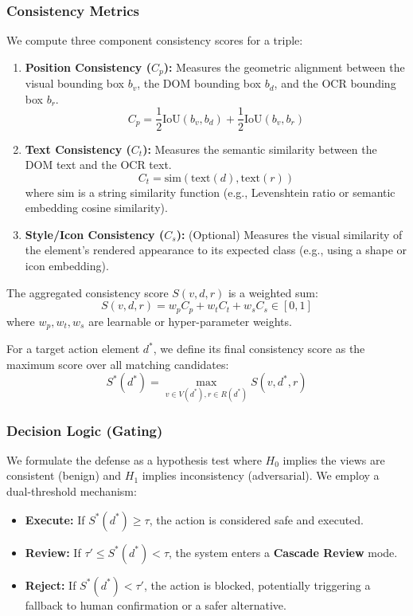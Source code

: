 \documentclass{llncs}
\begin{document}
\subsubsection{Consistency Metrics}
We compute three component consistency scores for a triple:
\begin{enumerate}
    \item \textbf{Position Consistency ($C_p$):} Measures the geometric alignment between the visual bounding box $b_v$, the DOM bounding box $b_d$, and the OCR bounding box $b_r$.
    \[
    C_p = \frac{1}{2}\text{IoU}(b_v, b_d) + \frac{1}{2}\text{IoU}(b_v, b_r)
    \]
    \item \textbf{Text Consistency ($C_t$):} Measures the semantic similarity between the DOM text and the OCR text.
    \[
    C_t = \text{sim}(\text{text}(d), \text{text}(r))
    \]
    where $\text{sim}$ is a string similarity function (e.g., Levenshtein ratio or semantic embedding cosine similarity).
    \item \textbf{Style/Icon Consistency ($C_s$):} (Optional) Measures the visual similarity of the element's rendered appearance to its expected class (e.g., using a shape or icon embedding).
\end{enumerate}

The aggregated consistency score $S(v, d, r)$ is a weighted sum:
\[
S(v, d, r) = w_p C_p + w_t C_t + w_s C_s \in [0, 1]
\]
where $w_p, w_t, w_s$ are learnable or hyper-parameter weights.

For a target action element $d^*$, we define its final consistency score as the maximum score over all matching candidates:
\[
S^*(d^*) = \max_{v \in V(d^*), r \in R(d^*)} S(v, d^*, r)
\]

\subsubsection{Decision Logic (Gating)}
We formulate the defense as a hypothesis test where $H_0$ implies the views are consistent (benign) and $H_1$ implies inconsistency (adversarial). We employ a dual-threshold mechanism:
\begin{itemize}
    \item \textbf{Execute:} If $S^*(d^*) \ge \tau$, the action is considered safe and executed.
    \item \textbf{Review:} If $\tau' \le S^*(d^*) < \tau$, the system enters a \textbf{Cascade Review} mode.
    \item \textbf{Reject:} If $S^*(d^*) < \tau'$, the action is blocked, potentially triggering a fallback to human confirmation or a safer alternative.
\end{itemize}
\end{document}
